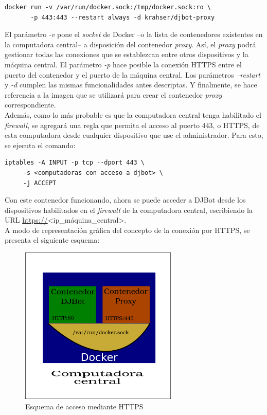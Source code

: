 \documentclass[a4paper,12pt]{article}
\begin{document}
\begin{verbatim}
docker run -v /var/run/docker.sock:/tmp/docker.sock:ro \
       -p 443:443 --restart always -d krahser/djbot-proxy
\end{verbatim}

El parámetro \emph{-v} pone el \emph{socket} de Docker --o la lista de contenedores existentes en la computadora central-- a disposición del contenedor \emph{proxy}. Así, el \emph{proxy} podrá gestionar todas las conexiones que se establezcan entre otros dispositivos y la máquina central. El parámetro \emph{-p} hace posible la conexión HTTPS entre el puerto del contenedor y el puerto de la máquina central. Los parámetros \emph{--restart} y \emph{-d} cumplen las mismas funcionalidades antes descriptas. Y finalmente, se hace referencia a la imagen que se utilizará para crear el contenedor \emph{proxy} correspondiente.\\

Además, como lo más probable es que la computadora central tenga habilitado el \emph{firewall}, se agregará una regla que permita el acceso al puerto 443, o HTTPS, de esta computadora desde cualquier dispositivo que use el administrador. Para esto, se ejecuta el comando:

\begin{verbatim}
iptables -A INPUT -p tcp --dport 443 \
	 -s <computadoras con acceso a djbot> \
	 -j ACCEPT
\end{verbatim}

Con este contenedor funcionando, ahora se puede acceder a DJBot desde los dispositivos habilitados en el \emph{firewall} de la computadora central, escribiendo la URL \url{https://}<ip\_máquina\_central>.\\

A modo de representación gráfica del concepto de la conexión por HTTPS, se presenta el siguiente esquema:\\
\newpage
\begin{figure}[htb]
\centering
\includegraphics[width=7.5cm]{./img/https.svg.png}
\caption{Esquema de acceso mediante HTTPS}
\end{figure}\\
\end{document}
